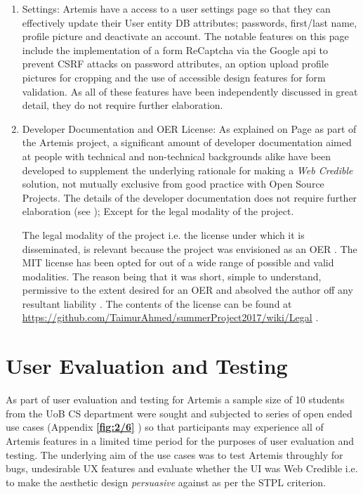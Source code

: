 \begin{enumerate}
    
    \item Settings: Artemis have a access to a user settings page so that they can effectively update their User entity DB attributes; passwords, first/last name, profile picture and deactivate an account. The notable features on this page include the implementation of a form ReCaptcha via the Google api to prevent CSRF attacks on password attributes, an option upload profile pictures for cropping and the use of accessible design features for form validation. As all of these features have been independently discussed in great detail, they do not require further elaboration.
    
    \item Developer Documentation and OER License: As explained on Page \textbf{\pageref{wiki}} as part of the Artemis project, a significant amount of developer documentation aimed at people with technical and non-technical backgrounds alike have been developed to supplement the underlying rationale for making a \textit{Web Credible} solution, not mutually exclusive from good practice with Open Source Projects.  The details of the developer documentation does not require further elaboration (see \pageref{developer}); Except for the legal modality of the project.
    
    The legal modality of the project i.e. the license under which it is disseminated, is relevant because the project was envisioned as an OER \cite{UNESCO}. The MIT license \cite{Github} has been opted for out of a wide range of possible and valid modalities. The reason being that it was short, simple to understand, permissive to the extent desired for an OER \cite{UNESCO} and absolved the author off any resultant liability \cite{Github}. The contents of the license can be found at \url{https://github.com/TaimurAhmed/summerProject2017/wiki/Legal} .
    
    
    
    
\end{enumerate}


\section{User Evaluation and Testing}
\label{sec:evalAndTesting}

    As part of user evaluation and testing for Artemis a sample size of 10 students from the UoB CS department were sought and subjected to series of open ended use cases (Appendix \textbf{\ref{fig:2/6}} ) so that participants may experience all of Artemis features in a limited time period for the purposes of user evaluation and testing. The underlying aim of the use cases was to test Artemis throughly for bugs, undesirable UX features and evaluate whether the UI was Web Credible i.e. to make the aesthetic design \textit{persuasive} against as per the STPL criterion.
    
